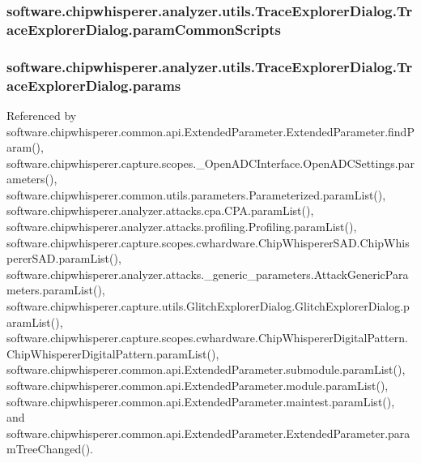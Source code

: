 \subsubsection[{param\+Common\+Scripts}]{\setlength{\rightskip}{0pt plus 5cm}software.\+chipwhisperer.\+analyzer.\+utils.\+Trace\+Explorer\+Dialog.\+Trace\+Explorer\+Dialog.\+param\+Common\+Scripts}\label{classsoftware_1_1chipwhisperer_1_1analyzer_1_1utils_1_1TraceExplorerDialog_1_1TraceExplorerDialog_a78ac6a0ef5f3da2b23858f995bd33115}
\hypertarget{classsoftware_1_1chipwhisperer_1_1analyzer_1_1utils_1_1TraceExplorerDialog_1_1TraceExplorerDialog_a20f13479fb82a81bc675668adbc7438e}{}
\subsubsection[{params}]{\setlength{\rightskip}{0pt plus 5cm}software.\+chipwhisperer.\+analyzer.\+utils.\+Trace\+Explorer\+Dialog.\+Trace\+Explorer\+Dialog.\+params}\label{classsoftware_1_1chipwhisperer_1_1analyzer_1_1utils_1_1TraceExplorerDialog_1_1TraceExplorerDialog_a20f13479fb82a81bc675668adbc7438e}


Referenced by software.\+chipwhisperer.\+common.\+api.\+Extended\+Parameter.\+Extended\+Parameter.\+find\+Param(), software.\+chipwhisperer.\+capture.\+scopes.\+\_\+\+Open\+A\+D\+C\+Interface.\+Open\+A\+D\+C\+Settings.\+parameters(), software.\+chipwhisperer.\+common.\+utils.\+parameters.\+Parameterized.\+param\+List(), software.\+chipwhisperer.\+analyzer.\+attacks.\+cpa.\+C\+P\+A.\+param\+List(), software.\+chipwhisperer.\+analyzer.\+attacks.\+profiling.\+Profiling.\+param\+List(), software.\+chipwhisperer.\+capture.\+scopes.\+cwhardware.\+Chip\+Whisperer\+S\+A\+D.\+Chip\+Whisperer\+S\+A\+D.\+param\+List(), software.\+chipwhisperer.\+analyzer.\+attacks.\+\_\+generic\+\_\+parameters.\+Attack\+Generic\+Parameters.\+param\+List(), software.\+chipwhisperer.\+capture.\+utils.\+Glitch\+Explorer\+Dialog.\+Glitch\+Explorer\+Dialog.\+param\+List(), software.\+chipwhisperer.\+capture.\+scopes.\+cwhardware.\+Chip\+Whisperer\+Digital\+Pattern.\+Chip\+Whisperer\+Digital\+Pattern.\+param\+List(), software.\+chipwhisperer.\+common.\+api.\+Extended\+Parameter.\+submodule.\+param\+List(), software.\+chipwhisperer.\+common.\+api.\+Extended\+Parameter.\+module.\+param\+List(), software.\+chipwhisperer.\+common.\+api.\+Extended\+Parameter.\+maintest.\+param\+List(), and software.\+chipwhisperer.\+common.\+api.\+Extended\+Parameter.\+Extended\+Parameter.\+param\+Tree\+Changed().

